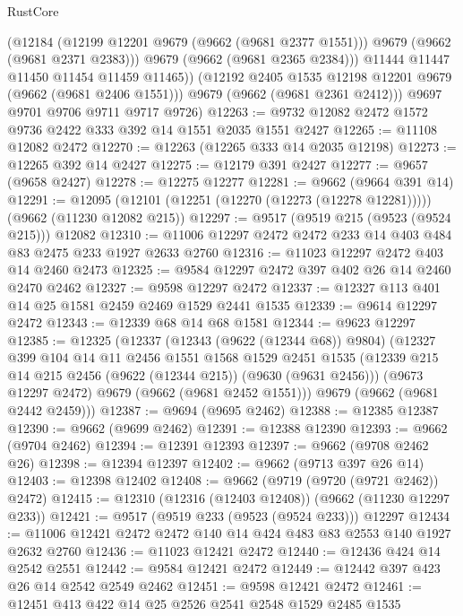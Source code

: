 \begin{lexlean}{RustCore}
\begin{coremodule}
              (@12184
                (@12199 @12201 @9679 (@9662 (@9681 @2377 @1551)))
                @9679
                (@9662 (@9681 @2371 @2383)))
              @9679
              (@9662 (@9681 @2365 @2384)))
            @11444
            @11447
            @11450
            @11454
            @11459
            @11465))
        (@12192 @2405 @1535 @12198 @12201 @9679 (@9662 (@9681 @2406 @1551)))
        @9679
        (@9662 (@9681 @2361 @2412)))
      @9697
      @9701
      @9706
      @9711
      @9717
      @9726)
@12263 := @9732 @12082 @2472 @1572 @9736 @2422 @333 @392 @14 @1551 @2035 @1551 @2427
@12265 := @11108 @12082 @2472
@12270 := @12263 (@12265 @333 @14 @2035 @12198)
@12273 := @12265 @392 @14 @2427
@12275 := @12179 @391 @2427
@12277 := @9657 (@9658 @2427)
@12278 := @12275 @12277
@12281 := @9662 (@9664 @391 @14)
@12291 := @12095 (@12101 (@12251 (@12270 (@12273 (@12278 @12281))))) (@9662 (@11230 @12082 @215))
@12297 := @9517 (@9519 @215 (@9523 (@9524 @215))) @12082
@12310 := @11006 @12297 @2472 @2472 @233 @14 @403 @484 @83 @2475 @233 @1927 @2633 @2760
@12316 := @11023 @12297 @2472 @403 @14 @2460 @2473
@12325 := @9584 @12297 @2472 @397 @402 @26 @14 @2460 @2470 @2462
@12327 := @9598 @12297 @2472
@12337 := @12327 @113 @401 @14 @25 @1581 @2459 @2469 @1529 @2441 @1535
@12339 := @9614 @12297 @2472
@12343 := @12339 @68 @14 @68 @1581
@12344 := @9623 @12297
@12385 := @12325
    (@12337
      (@12343 (@9622 (@12344 @68)) @9804)
      (@12327
        @399
        @104
        @14
        @11
        @2456
        @1551
        @1568
        @1529
        @2451
        @1535
        (@12339 @215 @14 @215 @2456 (@9622 (@12344 @215)) (@9630 (@9631 @2456)))
        (@9673 @12297 @2472)
        @9679
        (@9662 (@9681 @2452 @1551)))
      @9679
      (@9662 (@9681 @2442 @2459)))
@12387 := @9694 (@9695 @2462)
@12388 := @12385 @12387
@12390 := @9662 (@9699 @2462)
@12391 := @12388 @12390
@12393 := @9662 (@9704 @2462)
@12394 := @12391 @12393
@12397 := @9662 (@9708 @2462 @26)
@12398 := @12394 @12397
@12402 := @9662 (@9713 @397 @26 @14)
@12403 := @12398 @12402
@12408 := @9662 (@9719 (@9720 (@9721 @2462)) @2472)
@12415 := @12310 (@12316 (@12403 @12408)) (@9662 (@11230 @12297 @233))
@12421 := @9517 (@9519 @233 (@9523 (@9524 @233))) @12297
@12434 := @11006 @12421 @2472 @2472 @140 @14 @424 @483 @83 @2553 @140 @1927 @2632 @2760
@12436 := @11023 @12421 @2472
@12440 := @12436 @424 @14 @2542 @2551
@12442 := @9584 @12421 @2472
@12449 := @12442 @397 @423 @26 @14 @2542 @2549 @2462
@12451 := @9598 @12421 @2472
@12461 := @12451 @413 @422 @14 @25 @2526 @2541 @2548 @1529 @2485 @1535

\end{coremodule}
\end{lexlean}
